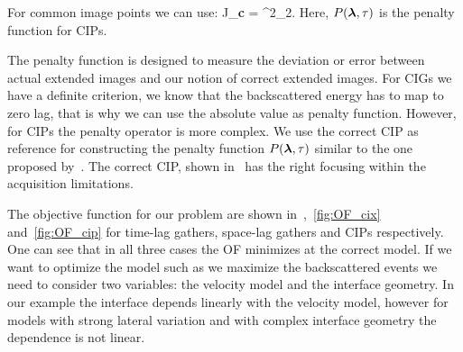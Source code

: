 For common image points we can use:
\beq
J_{\bf c} =   ^2_2.
\eeq
%
Here, $P({\boldsymbol{\lambda}},\tau)$ is the penalty function for CIPs.

The penalty function is designed to measure the deviation or error between actual extended images and our notion of correct 
extended images. For CIGs we have a definite criterion, we know that the backscattered energy has to map
to zero lag, that is why we can use the absolute value as penalty function. However, for CIPs the 
penalty operator is more complex. We use the correct CIP as reference for constructing the penalty function $P({\boldsymbol{\lambda}},\tau)$ similar
to the one proposed by~\citep{tony:cwp12}. The correct CIP, shown in~ has the right focusing within the acquisition limitations.

The objective function for our problem are shown in~,~\ref{fig:OF_cix} and~\ref{fig:OF_cip} for time-lag gathers, space-lag gathers and
CIPs respectively. One can see that in all three cases the OF minimizes at the correct model. If we want to optimize the model such as 
we maximize the backscattered events we need to consider two variables: the velocity model and the interface geometry. In our example
the interface depends linearly with the velocity model, however for models with strong lateral variation and with complex interface
geometry the dependence is not linear.



